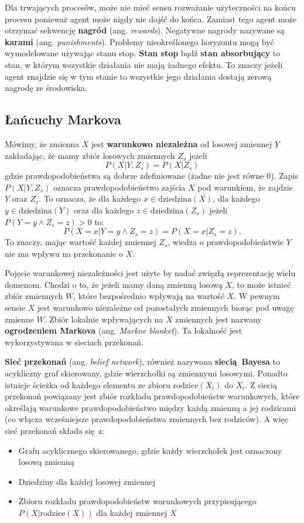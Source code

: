 \documentclass[a4paper, 12pt,oneside]{book}
\begin{document}
Dla trwających procesów, może nie mieć sensu rozważanie użyteczności na końcu
procesu ponieważ agent może nigdy nie dojść do końca. Zamiast tego agent może
otrzymać sekwencję \textbf{nagród} (ang. \textit{rewards}).
Negatywne nagrody nazywane są \textbf{karami} (ang. \textit{punishments}).
Problemy nieokreślonego horyzontu mogą być wymodelowane używając stanu
stop. \textbf{Stan stop} bądź \textbf{stan absorbujący} to stan, w którym
wszystkie działania nie mają żadnego efektu. To znaczy jeżeli agent znajdzie
się w tym stanie to wszystkie jego działania dostają zerową nagrodę ze
środowiska.

\subsection{Łańcuchy Markova}
Mówimy, że zmienna $X$ jest \textbf{warunkowo niezależna} od losowej zmiennej
$Y$ zakładając, że mamy zbiór losowych zmiennych $Z_s$ jeżeli
\[P(X | Y, Z_s) = P(X| Z_s)\]
gdzie prawdopodobieństwa są dobrze zdefiniowane (żadne nie jest równe $0$).
Zapis $P(X| Y, Z_s)$ oznacza prawdopodobieństwo zajścia $X$ pod
warunkiem, że zajdzie $Y$ oraz $Z_s$. To oznacza, że dla każdego $x \in
\text{dziedzina}(X)$, dla każdego $y \in \text{dziedzina}(Y)$ oraz dla każdego
$z \in \text{dziedzina}(Z_s)$ jeżeli $P(Y = y \wedge Z_s = z) > 0$ to:
\[P(X=x|Y=y \wedge Z_s = z) = P(X=x|Z_s = z).\]
To znaczy, mając wartość każdej zmiennej $Z_s$, wiedza o prawdopodobieństwie
$Y$ nie ma wpływu na przekonanie o $X$.

Pojęcie warunkowej niezależności jest użyte by nadać zwięzłą reprezentację
wielu domenom. Chodzi o to, że jeżeli mamy daną zmienną losową $X$, to może
istnieć zbiór zmiennych $W$, które bezpośrednio wpływają na wartość $X$. W
pewnym sensie $X$ jest warunkowo niezależne od pozostałych zmiennych biorąc pod
uwagę  zmienne $W$. Zbiór lokalnie wpływających na $X$ zmiennych jest nazwany
\textbf{ogrodzeniem Markova} (ang. \textit{Markov blanket}). Ta lokalność
jest wykorzystywana w sieciach przekonań\cite{ai_foundations_belief_networks}.

\textbf{Sieć przekonań} (ang. \textit{belief network}), również nazywana
\textbf{siecią Bayesa} to acykliczny graf skierowany, gdzie wierzchołki są
zmiennymi losowymi. Ponadto istnieje ścieżka od każdego elementu ze zbioru
$\text{rodzice}(X_i)$ do $X_i$. Z siecią przekonań powiązany jest zbiór
rozkładu prawdopodobieństw warunkowych, które określają warunkowe
prawdopodobieństwo między każdą zmienną a jej rodzicami (co włącza wcześniejsze
prawdopodobieństwa zmiennych bez rodziców). A więc sieć przekonań składa się z:
\begin{itemize}
	\setlength\itemsep{-0.4em}
\item Grafu acyklicznego skierowanego, gdzie każdy wierzchołek jest oznaczony
	losową zmienną
\item Dziedziny dla każdej losowej zmiennej
\item Zbioru rozkładu prawdopodobieństw warunkowych przypisującego
	$P(X|\text{rodzice}(X))$ dla każdej zmiennej $X$
\end{itemize}
\end{document}
